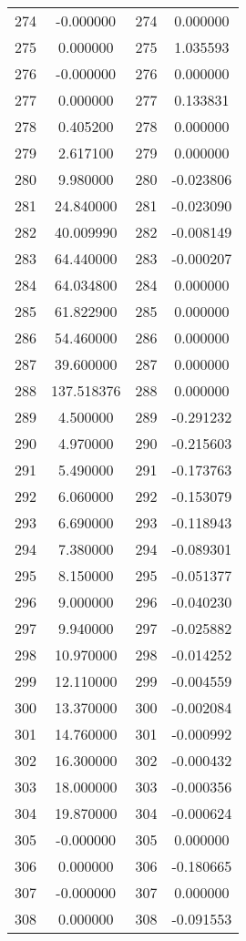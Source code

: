 \documentclass[12pt]{article}
\begin{document}
\begin{longtable}{@{}cccc@{}}
274 & -0.000000 & 274 & 0.000000 \\
275 & 0.000000 & 275 & 1.035593 \\
276 & -0.000000 & 276 & 0.000000 \\
277 & 0.000000 & 277 & 0.133831 \\
278 & 0.405200 & 278 & 0.000000 \\
279 & 2.617100 & 279 & 0.000000 \\
280 & 9.980000 & 280 & -0.023806 \\
281 & 24.840000 & 281 & -0.023090 \\
282 & 40.009990 & 282 & -0.008149 \\
283 & 64.440000 & 283 & -0.000207 \\
284 & 64.034800 & 284 & 0.000000 \\
285 & 61.822900 & 285 & 0.000000 \\
286 & 54.460000 & 286 & 0.000000 \\
287 & 39.600000 & 287 & 0.000000 \\
288 & 137.518376 & 288 & 0.000000 \\
289 & 4.500000 & 289 & -0.291232 \\
290 & 4.970000 & 290 & -0.215603 \\
291 & 5.490000 & 291 & -0.173763 \\
292 & 6.060000 & 292 & -0.153079 \\
293 & 6.690000 & 293 & -0.118943 \\
294 & 7.380000 & 294 & -0.089301 \\
295 & 8.150000 & 295 & -0.051377 \\
296 & 9.000000 & 296 & -0.040230 \\
297 & 9.940000 & 297 & -0.025882 \\
298 & 10.970000 & 298 & -0.014252 \\
299 & 12.110000 & 299 & -0.004559 \\
300 & 13.370000 & 300 & -0.002084 \\
301 & 14.760000 & 301 & -0.000992 \\
302 & 16.300000 & 302 & -0.000432 \\
303 & 18.000000 & 303 & -0.000356 \\
304 & 19.870000 & 304 & -0.000624 \\
305 & -0.000000 & 305 & 0.000000 \\
306 & 0.000000 & 306 & -0.180665 \\
307 & -0.000000 & 307 & 0.000000 \\
308 & 0.000000 & 308 & -0.091553 \\

\end{longtable}
\end{document}
